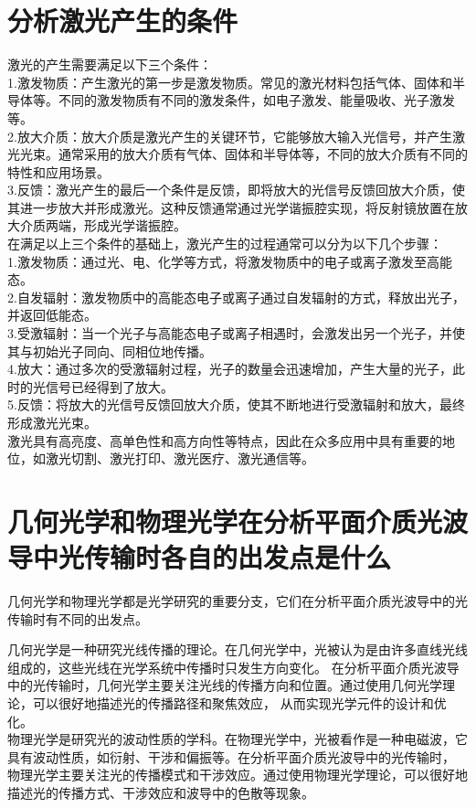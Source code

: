 \documentclass[12pt, a4paper, oneside]{article}
\begin{document}
\begin{spacing}{2.0}
\section{分析激光产生的条件}
激光的产生需要满足以下三个条件：
\\
1.激发物质：产生激光的第一步是激发物质。常见的激光材料包括气体、固体和半导体等。不同的激发物质有不同的激发条件，如电子激发、能量吸收、光子激发等。
\\
2.放大介质：放大介质是激光产生的关键环节，它能够放大输入光信号，并产生激光光束。通常采用的放大介质有气体、固体和半导体等，不同的放大介质有不同的特性和应用场景。
\\
3.反馈：激光产生的最后一个条件是反馈，即将放大的光信号反馈回放大介质，使其进一步放大并形成激光。这种反馈通常通过光学谐振腔实现，将反射镜放置在放大介质两端，形成光学谐振腔。
\\
在满足以上三个条件的基础上，激光产生的过程通常可以分为以下几个步骤：
\\
1.激发物质：通过光、电、化学等方式，将激发物质中的电子或离子激发至高能态。
\\
2.自发辐射：激发物质中的高能态电子或离子通过自发辐射的方式，释放出光子，并返回低能态。
\\
3.受激辐射：当一个光子与高能态电子或离子相遇时，会激发出另一个光子，并使其与初始光子同向、同相位地传播。
\\
4.放大：通过多次的受激辐射过程，光子的数量会迅速增加，产生大量的光子，此时的光信号已经得到了放大。
\\
5.反馈：将放大的光信号反馈回放大介质，使其不断地进行受激辐射和放大，最终形成激光光束。
\\
激光具有高亮度、高单色性和高方向性等特点，因此在众多应用中具有重要的地位，如激光切割、激光打印、激光医疗、激光通信等。




\section{几何光学和物理光学在分析平面介质光波导中光传输时各自的出发点是什么}
几何光学和物理光学都是光学研究的重要分支，它们在分析平面介质光波导中的光传输时有不同的出发点。

几何光学是一种研究光线传播的理论。在几何光学中，光被认为是由许多直线光线组成的，这些光线在光学系统中传播时只发生方向变化。
在分析平面介质光波导中的光传输时，几何光学主要关注光线的传播方向和位置。通过使用几何光学理论，可以很好地描述光的传播路径和聚焦效应，
从而实现光学元件的设计和优化。
\\
物理光学是研究光的波动性质的学科。在物理光学中，光被看作是一种电磁波，它具有波动性质，如衍射、干涉和偏振等。在分析平面介质光波导中的光传输时，
物理光学主要关注光的传播模式和干涉效应。通过使用物理光学理论，可以很好地描述光的传播方式、干涉效应和波导中的色散等现象。


\end{spacing}
\end{document}
